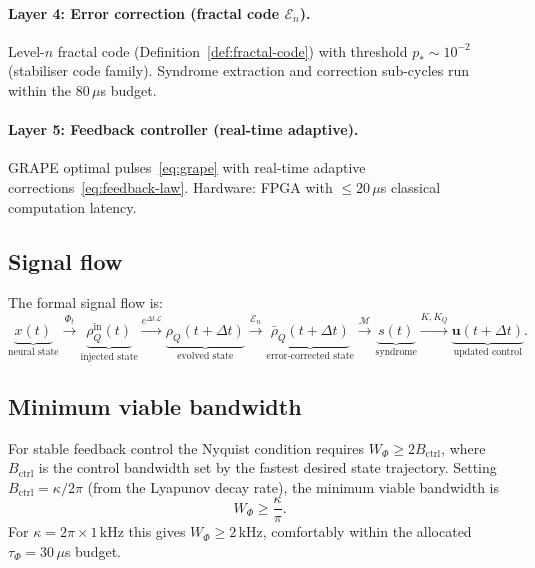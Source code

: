 \paragraph{Layer 4: Error correction (fractal code $\mathcal{E}_n$).}
Level-$n$ fractal code (Definition~\ref{def:fractal-code}) with
threshold $p_* \sim 10^{-2}$ (stabiliser code family).  Syndrome
extraction and correction sub-cycles run within the $80\,\mu$s budget.

\paragraph{Layer 5: Feedback controller (real-time adaptive).}
GRAPE optimal pulses~\eqref{eq:grape} with real-time adaptive
corrections~\eqref{eq:feedback-law}.  Hardware: FPGA with $\leq 20\,\mu$s
classical computation latency.

\subsection{Signal flow}

The formal signal flow is:
\begin{equation}\label{eq:signal-flow}
  \underbrace{x(t)}_{\text{neural state}}
  \xrightarrow{\Phi_t}
  \underbrace{\rho_Q^{\mathrm{in}}(t)}_{\text{injected state}}
  \xrightarrow{e^{\Delta t\,\mathcal{L}}}
  \underbrace{\rho_Q(t+\Delta t)}_{\text{evolved state}}
  \xrightarrow{\mathcal{E}_n}
  \underbrace{\bar{\rho}_Q(t+\Delta t)}_{\text{error-corrected state}}
  \xrightarrow{\mathcal{M}}
  \underbrace{s(t)}_{\text{syndrome}}
  \xrightarrow{K,K_Q}
  \underbrace{\mathbf{u}(t+\Delta t)}_{\text{updated control}}.
\end{equation}

\subsection{Minimum viable bandwidth}

For stable feedback control the Nyquist condition requires
$W_\Phi \geq 2 B_{\mathrm{ctrl}}$, where $B_{\mathrm{ctrl}}$ is the
control bandwidth set by the fastest desired state trajectory.  Setting
$B_{\mathrm{ctrl}} = \kappa/2\pi$ (from the Lyapunov decay rate), the
minimum viable bandwidth is
\begin{equation}\label{eq:min-bandwidth}
  W_\Phi \geq \frac{\kappa}{\pi}.
\end{equation}
For $\kappa = 2\pi \times 1\,\text{kHz}$ this gives $W_\Phi \geq 2\,\text{kHz}$,
comfortably within the allocated $\tau_\Phi = 30\,\mu$s budget.


